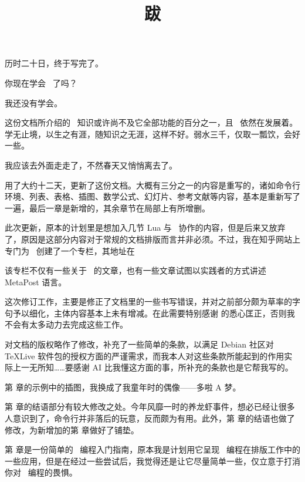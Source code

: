 \title{跋}

历时二十日，终于写完了。

你现在学会 \CONTEXT\ 了吗？

我还没有学会。

这份文档所介绍的 \CONTEXT\ 知识或许尚不及它全部功能的百分之一，且 \CONTEXT\ 依然在发展着。学无止境，以生之有涯，随知识之无涯，这样不好。弱水三千，仅取一瓢饮，会好一些。

我应该去外面走走了，不然春天又悄悄离去了。

\blank[line]

\midaligned{\hl[8]}
\blank[line]
\indentation 用了大约十二天，更新了这份文档。大概有三分之一的内容是重写的，诸如命令行环境、列表、表格、插图、数学公式、幻灯片、参考文献等内容，基本是重新写了一遍，最后一章是新增的，其余章节在局部上有所增删。

此次更新，原本的计划里是想加入几节 Lua 与 \CONTEXT\ 协作的内容，但是后来又放弃了，原因是这部分内容对于常规的文档排版而言并非必须。不过，我在知乎网站上专门为 \CONTEXT\ 创建了一个专栏，其地址在

\midaligned{\boxquote{\from[zhuanlan]}}

\noindent 该专栏不仅有一些关于 \CONTEXT\ 的文章，也有一些文章试图以实践者的方式讲述 MetaPost 语言。

\blank[line]

\midaligned{\hl[8]}
\blank[line]
\indentation 这次修订工作，主要是修正了文档里的一些书写错误，并对之前部分颇为草率的字句予以细化，主体内容基本上未有增减。在此需要特别感谢 \from[expolorer-cc] 的悉心匡正，否则我不会有太多动力去完成这些工作。

对文档的版权略作了修改，补充了一些简单的条款，以满足 Debian 社区对 TeXLive 软件包的授权方面的严谨需求，而我本人对这些条款所能起到的作用实际上一无所知……要感谢 AI 比我懂这方面的事，所补充的条款也是它帮我写的。

第 \in[Figure] 章的示例中的插图，我换成了我童年时的偶像——多啦 A 梦。

第 \in[Installation] 章的结语部分有较大修改之处。今年风靡一时的养龙虾事件，想必已经让很多人意识到了，命令行并非落后的玩意，反而颇为有用。此外，第 \in[misc] 章的结语也做了修改，为新增加的第 \in[programming] 章做好了铺垫。

第 \in[programming] 章是一份简单的 \TEX\ 编程入门指南，原本我是计划用它呈现 \TEX\ 编程在排版工作中的一些应用，但是在经过一些尝试后，我觉得还是让它尽量简单一些，仅立意于打消你对 \TEX\ 编程的畏惧。

\blank[line]
